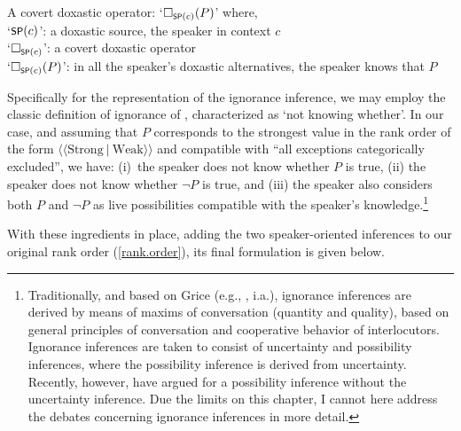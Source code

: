 \documentclass[output=paper,colorlinks,citecolor=brown]{langscibook}
\begin{document}
\ea \label{doxastic}
A covert doxastic operator: `$\Box_{\cnst{sp}(c)}(P)$' where, \\
`$\cnst{sp}(c)$': a doxastic source, the speaker in context $c$\\
 `$\Box_{\cnst{sp}(c)}$': a covert doxastic operator\\
 `$\Box_{\cnst{sp}(c)}(P)$': in all the speaker's doxastic alternatives, the speaker knows that $P$\\
\z

\noindent
Specifically for the representation of the ignorance inference, we may employ the
classic definition of ignorance of \citet{Hintikka1962-HINKAB}, characterized as `not knowing whether'. In our case, and assuming that
$P$ corresponds to the strongest value in the rank order of the form
$\langle \langle \text{Strong} \ | \  \text{Weak} \rangle \rangle$
and compatible with ``all exceptions categorically excluded'',
we have: (i)~the speaker does not know whether $P$ is true, (ii) the speaker does not
know whether $\neg P$ is true,
and (iii) the speaker also
considers both $P$ and $\neg P$
as live possibilities compatible with the speaker's knowledge.\footnote{Traditionally, and based on Grice (e.g., \citealt{Grice1975,Grice1989}, i.a.), ignorance inferences are derived
by means of maxims of conversation (quantity and quality),
based on general principles of conversation and cooperative behavior of
interlocutors. Ignorance inferences are taken to consist of uncertainty and possibility
inferences, where the possibility inference is derived from uncertainty.
Recently, however, \citet{Deganoetal2025} have argued
for a possibility inference without the uncertainty inference. Due
the limits on this chapter, I cannot here address the debates concerning
ignorance inferences in more detail.}


With these ingredients in place, adding the two speaker-oriented
inferences to
our original rank order (\ref{rank.order}), its final formulation is given below.
\end{document}
